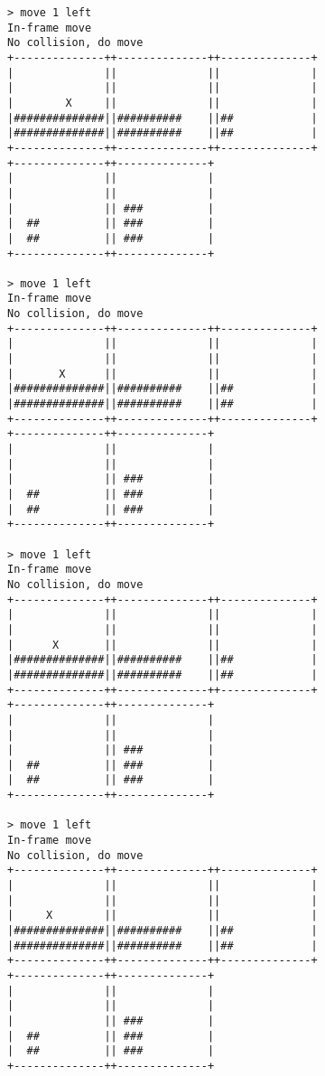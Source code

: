 \begin{verbatim}
> move 1 left
In-frame move
No collision, do move
+--------------++--------------++--------------+
|              ||              ||              |
|              ||              ||              |
|        X     ||              ||              |
|##############||##########    ||##            |
|##############||##########    ||##            |
+--------------++--------------++--------------+
+--------------++--------------+                
|              ||              |                
|              ||              |                
|              || ###          |                
|  ##          || ###          |                
|  ##          || ###          |                
+--------------++--------------+                

> move 1 left
In-frame move
No collision, do move
+--------------++--------------++--------------+
|              ||              ||              |
|              ||              ||              |
|       X      ||              ||              |
|##############||##########    ||##            |
|##############||##########    ||##            |
+--------------++--------------++--------------+
+--------------++--------------+                
|              ||              |                
|              ||              |                
|              || ###          |                
|  ##          || ###          |                
|  ##          || ###          |                
+--------------++--------------+                

> move 1 left
In-frame move
No collision, do move
+--------------++--------------++--------------+
|              ||              ||              |
|              ||              ||              |
|      X       ||              ||              |
|##############||##########    ||##            |
|##############||##########    ||##            |
+--------------++--------------++--------------+
+--------------++--------------+                
|              ||              |                
|              ||              |                
|              || ###          |                
|  ##          || ###          |                
|  ##          || ###          |                
+--------------++--------------+                

> move 1 left
In-frame move
No collision, do move
+--------------++--------------++--------------+
|              ||              ||              |
|              ||              ||              |
|     X        ||              ||              |
|##############||##########    ||##            |
|##############||##########    ||##            |
+--------------++--------------++--------------+
+--------------++--------------+                
|              ||              |                
|              ||              |                
|              || ###          |                
|  ##          || ###          |                
|  ##          || ###          |                
+--------------++--------------+                


\end{verbatim}
